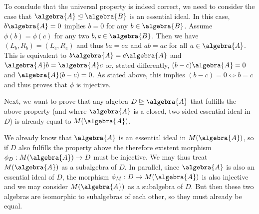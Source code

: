 \documentclass[a4paper]{article}
\begin{document}
To conclude that the universal property is indeed correct, we need to consider the case that $\algebra{A} \trianglelefteq \algebra{B}$ is an essential ideal. 
In this case, $b \algebra{A} = 0$ implies $b = 0$ for any $b \in \algebra{B}$.
Assume $\phi(b) = \phi(c)$ for any two $b, c \in \algebra{B}$. 
Then we have $(L_b, R_b) = (L_c, R_c)$ and thus $b a = c a$ and $a b = a c$ for all $a \in \algebra{A}$.
This is equivalent to $b \algebra{A} = c \algebra{A}$ and $\algebra{A} b = \algebra{A} c$ or, stated differently, $(b-c) \algebra{A} = 0$ and $\algebra{A} (b-c) = 0$.
As stated above, this implies $(b-c) = 0 \iff b = c$ and thus proves that $\phi$ is injective.

Next, we want to prove that any algebra $D \trianglerighteq \algebra{A}$ that fulfills the above property (and where $\algebra{A}$ is a closed, two-sided essential ideal in $D$) is already equal to $M(\algebra{A})$.

We already know that $\algebra{A}$ is an essential ideal in $M(\algebra{A})$, so if $D$ also fulfills the property above the therefore existent morphism $\phi_D: M(\algebra{A}) \to D$ must be injective.
We may thus treat $M(\algebra{A})$ as a subalgebra of $D$.
In parallel, since $\algebra{A}$ is also an essential ideal of $D$, the morphism $\phi_M: D \to M(\algebra{A})$ is also injective and we may consider $M(\algebra{A})$ as a subalgebra of $D$.
But then these two algebras are isomorphic to subalgebras of each other, so they must already be equal.

\subsection{}
\end{document}

